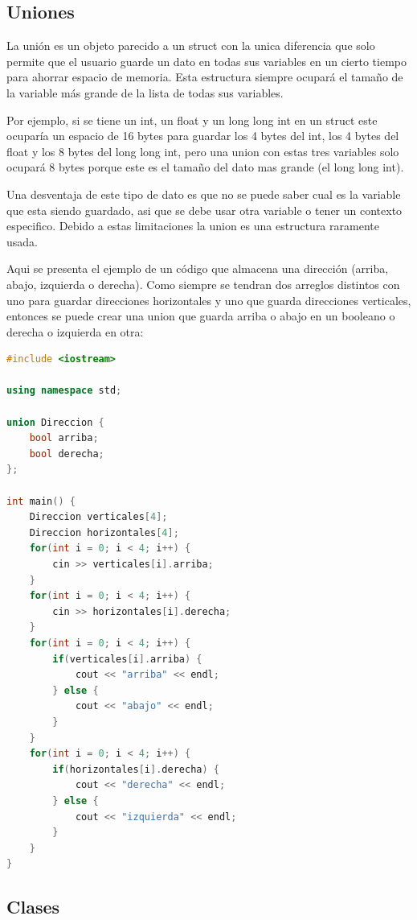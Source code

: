 \documentclass{article}
\begin{document}
\subsection{Uniones}

La unión es un objeto parecido a un struct con la unica diferencia que solo permite que el usuario guarde un dato en todas sus variables en un cierto tiempo para ahorrar espacio de memoria. Esta estructura siempre ocupará el tamaño de la variable más grande de la lista de todas sus variables.

Por ejemplo, si se tiene un int, un float y un long long int en un struct este ocuparía un espacio de 16 bytes para guardar los 4 bytes del int, los 4 bytes del float y los 8 bytes del long long int, pero una union con estas tres variables solo ocupará 8 bytes porque este es el tamaño del dato mas grande (el long long int).

Una desventaja de este tipo de dato es que no se puede saber cual es la variable que esta siendo guardado, asi que se debe usar otra variable o tener un contexto especifico. Debido a estas limitaciones la union es una estructura raramente usada.

Aqui se presenta el ejemplo de un código que almacena una dirección (arriba, abajo, izquierda o derecha). Como siempre se tendran dos arreglos distintos con uno para guardar direcciones horizontales y uno que guarda direcciones verticales, entonces se puede crear una union que guarda arriba o abajo en un booleano o derecha o izquierda en otra:

\begin{lstlisting}[language=C++, caption=Uniones]
#include <iostream>

using namespace std;

union Direccion {
    bool arriba;
    bool derecha;
};

int main() {
    Direccion verticales[4];
    Direccion horizontales[4];
    for(int i = 0; i < 4; i++) {
        cin >> verticales[i].arriba;
    }
    for(int i = 0; i < 4; i++) {
        cin >> horizontales[i].derecha;
    }
    for(int i = 0; i < 4; i++) {
        if(verticales[i].arriba) {
            cout << "arriba" << endl;
        } else {
            cout << "abajo" << endl;
        }
    }
    for(int i = 0; i < 4; i++) {
        if(horizontales[i].derecha) {
            cout << "derecha" << endl;
        } else {
            cout << "izquierda" << endl;
        }
    }
}
\end{lstlisting}

\subsection{Clases}
\end{document}
